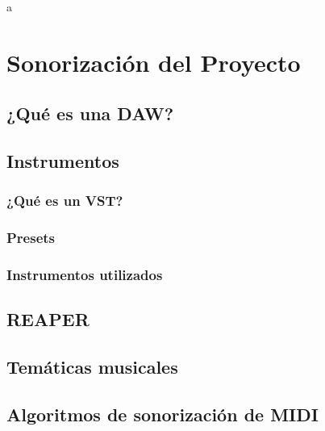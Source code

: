 a\chapter{Sonorización del Proyecto}

\section{¿Qué es una DAW?}
\section{Instrumentos}

\subsection{¿Qué es un VST?}

\subsection{Presets}

\subsection{Instrumentos utilizados}

\section{REAPER}

\section{Temáticas musicales}

\section{Algoritmos de sonorización de MIDI}


